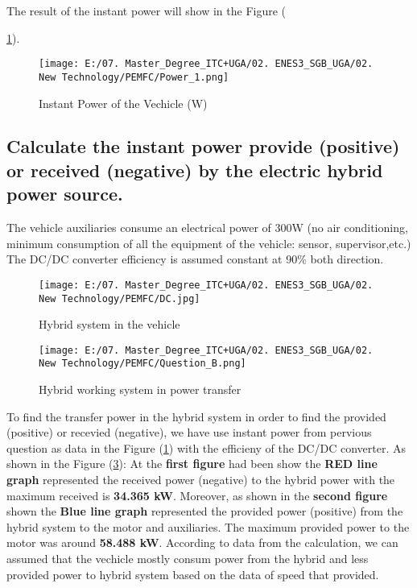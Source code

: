 \documentclass[12pt,a4paper]{article}
\numberwithin{equation}{section}
\begin{document}
	 The result of the instant power will show in the Figure ({\ref{5}).
	 
	 \begin{figure}[h]
	 	\centering 
	 	\texttt{[image: E:/07. Master\_Degree\_ITC+UGA/02. ENES3\_SGB\_UGA/02. New Technology/PEMFC/Power\_1.png]}
	 	\caption{\small {Instant Power of the Vechicle (W)}}
	 	\label{5}
	 \end{figure}
	

	\subsection{Calculate the instant power provide (positive) or received (negative) by the electric hybrid power source. }
	
	The vehicle auxiliaries consume an electrical power of 300W (no air conditioning, minimum consumption of all the equipment of the vehicle: sensor, supervisor,etc.) The DC/DC converter efficiency is assumed constant at 90\% both direction.
	
	\begin{figure}[h]
		\centering 
		\texttt{[image: E:/07. Master\_Degree\_ITC+UGA/02. ENES3\_SGB\_UGA/02. New Technology/PEMFC/DC.jpg]}
		\caption{\small {Hybrid system in the vehicle}}
		\label{6}
	\end{figure}
\newpage
	\begin{figure}[h]
	\centering 
	\texttt{[image: E:/07. Master\_Degree\_ITC+UGA/02. ENES3\_SGB\_UGA/02. New Technology/PEMFC/Question\_B.png]}
	\caption{\small {Hybrid working system in power transfer}}
	\label{7}
	\end{figure}
	To find the transfer power in the hybrid system in order to find the provided (positive) or recevied (negative), we have use instant power from pervious question as data in the Figure (\ref{5}) with the efficieny of the DC/DC converter. As shown in the Figure (\ref{7}): At the \textbf{first figure} had been show the \textbf{RED line graph} represented the received power (negative) to the hybrid power with the maximum received is \textbf{34.365 kW}. Moreover, as shown in the \textbf{second figure} shown the \textbf{Blue line graph} represented the provided power (positive) from the hybrid system to the motor and auxiliaries. The maximum provided power to the motor was around \textbf{58.488 kW}. According to data from the calculation, we can assumed that the vechicle mostly consum power from the hybrid and less provided power to hybrid system based on the data of speed that provided. 
	
}
\end{document}
